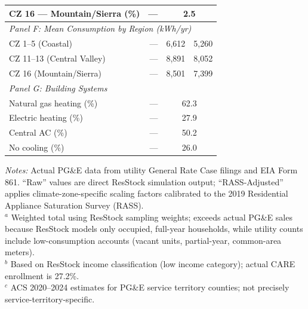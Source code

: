 \begin{table}[htbp]
\begin{tabular}{lrrr}
CZ 16 --- Mountain/Sierra (\%) & --- & \multicolumn{2}{c}{2.5} \\
\midrule
\multicolumn{4}{l}{\textit{Panel F: Mean Consumption by Region (kWh/yr)}} \\
CZ 1--5 (Coastal) & --- & 6,612 & 5,260 \\
CZ 11--13 (Central Valley) & --- & 8,891 & 8,052 \\
CZ 16 (Mountain/Sierra) & --- & 8,501 & 7,399 \\
\midrule
\multicolumn{4}{l}{\textit{Panel G: Building Systems}} \\
Natural gas heating (\%) & --- & \multicolumn{2}{c}{62.3} \\
Electric heating (\%) & --- & \multicolumn{2}{c}{27.9} \\
Central AC (\%) & --- & \multicolumn{2}{c}{50.2} \\
No cooling (\%) & --- & \multicolumn{2}{c}{26.0} \\
\bottomrule
\end{tabular}
\begin{minipage}{\textwidth}
\vspace{0.3em}
\footnotesize
\textit{Notes:} Actual PG\&E data from utility General Rate Case filings and EIA Form 861. ``Raw'' values are direct ResStock simulation output; ``RASS-Adjusted'' applies climate-zone-specific scaling factors calibrated to the 2019 Residential Appliance Saturation Survey (RASS). \\
$^a$ Weighted total using ResStock sampling weights; exceeds actual PG\&E sales because ResStock models only occupied, full-year households, while utility counts include low-consumption accounts (vacant units, partial-year, common-area meters). \\
$^b$ Based on ResStock income classification (low income category); actual CARE enrollment is 27.2\%. \\
$^c$ ACS 2020--2024 estimates for PG\&E service territory counties; not precisely service-territory-specific.
\end{minipage}
\end{table}
